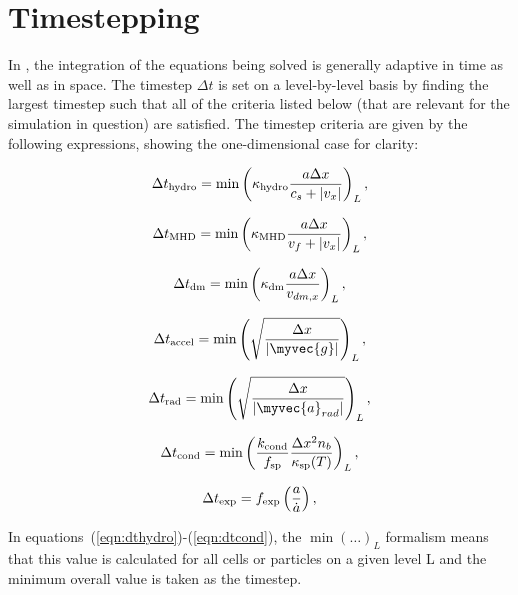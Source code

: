\section{Timestepping}
\label{sec.timestepping}

In \enzo, the integration of the equations being solved is generally
adaptive in time as well as in space.  The timestep $\Delta t$ is set
on a level-by-level basis by finding the largest timestep such that
all of the criteria listed below (that are relevant for the simulation
in question) are satisfied.  The timestep criteria are given by the
following expressions, showing the one-dimensional case for clarity:

\begin{equation}
\Delta t_{\rm hydro} = \min \left( \kappa_{\rm hydro} \frac{a \Delta x}{c_{s} + |v_x|} \right)_L ,
\label{eqn:dthydro}
\end{equation}

\begin{equation}
\Delta t_{\rm MHD} = \min \left( \kappa_{\rm MHD} \frac{a \Delta x}{v_{f} + |v_x|} \right)_L ,
\label{eqn:dtMHD}
\end{equation}

\begin{equation}
\Delta t_{\rm dm} = \min \left(\kappa_{\rm dm} \frac{a \Delta x}{v_{dm,x}} \right)_L ,
\label{eqn:dtdarkmatter}
\end{equation}

\begin{equation}
\Delta t_{\rm accel} = \min \left( \sqrt{\frac{\Delta x}{|\myvec{g}|}} \right)_L ,
\label{eqn:dtaccel}
\end{equation}

\begin{equation}
\Delta t_{\rm rad} = \min \left(  \sqrt{\frac{\Delta x}{|\myvec{a}_{rad}|}} \right)_L,
\label{eqn:dtrad}
\end{equation}

\begin{equation}
\Delta t_{\rm cond} = \min \left(  \frac{ k_{\rm cond}}{f_{\rm sp}} \frac{\Delta x^2
    n_b}{\kappa_{\rm sp}(T)} \right)_L,
\label{eqn:dtcond}
\end{equation}

\begin{equation}
\Delta t_{\rm exp} = f_{\rm exp} \left( \frac{a}{\dot{a}} \right) ,
\label{eqn:dtexpand}
\end{equation}

In equations~(\ref{eqn:dthydro})-(\ref{eqn:dtcond}), the $\min (
\ldots)_L$ formalism means that this value is calculated for all cells
or particles on a given level L and the minimum overall value is taken
as the timestep.

